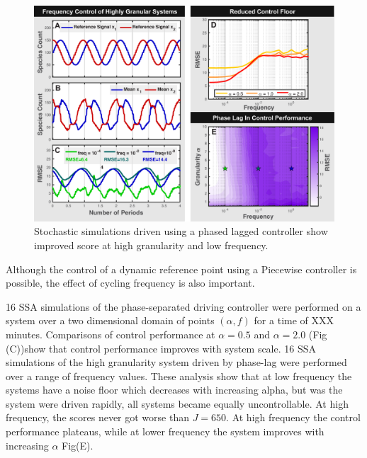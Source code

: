 \documentclass[12pt]{article}
\begin{document}
\begin{figure}
\begin{center}
\includegraphics[width=1\textwidth]{FrequencyControl.pdf}
\vspace{-0.1in}
\caption{Stochastic simulations driven using a phased lagged controller show improved score at high granularity and low frequency.}
\label{CRG}
\end{center}
\vspace{-0.2in}
\end{figure}
Although the control of a dynamic reference point using a Piecewise controller is possible, the effect of cycling frequency is also important.

16 SSA simulations of the phase-separated driving controller were performed on a system over a two dimensional domain of points $(\alpha,f)$ for a time of XXX minutes. Comparisons of control performance at $\alpha=0.5$ and $\alpha=2.0$ (Fig (C))show that control performance improves with system scale. 16 SSA simulations of the high granularity system driven by phase-lag were performed over a range of frequency values.  These analysis show that at low frequency the systems have a noise floor which decreases with increasing alpha, but was the system were driven rapidly, all systems became equally uncontrollable. At high frequency, the scores never got worse than $J=650$. At high frequency the control performance plateaus, while at lower frequency the system improves with increasing $\alpha$ Fig(E).
\end{document}
